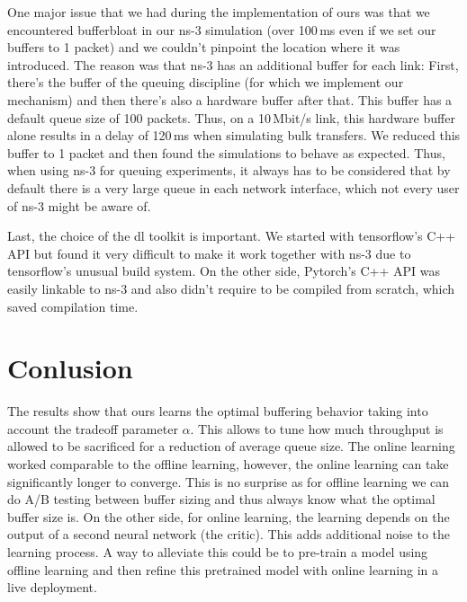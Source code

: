 \documentclass[conference]{IEEEtran}
\begin{document}
One major issue that we had during the implementation of \gls{ours} was that we encountered bufferbloat in our ns-3 simulation (over 100\,ms even if we set our buffers to 1 packet) and we couldn't pinpoint the location where it was introduced. The reason was that ns-3 has an additional buffer for each link: First, there's the buffer of the queuing discipline (for which we implement our mechanism) and then there's also a hardware buffer after that. This buffer has a default queue size of 100 packets. Thus, on a 10\,Mbit/s link, this hardware buffer alone results in a delay of 120\,ms when simulating bulk transfers. We reduced this buffer to 1 packet and then found the simulations to behave as expected. Thus, when using ns-3 for queuing experiments, it always has to be considered that by default there is a very large queue in each network interface, which not every user of ns-3 might be aware of. 

Last, the choice of the \gls{dl} toolkit is important. We started with tensorflow's C++ API but found it very difficult to make it work together with ns-3 due to tensorflow's unusual build system. On the other side, Pytorch's C++ API was easily linkable to ns-3 and also didn't require to be compiled from scratch, which saved compilation time. 

\section{Conlusion}

The results show that \gls{ours} learns the optimal buffering behavior taking into account the tradeoff parameter $\alpha$. This allows to tune how much throughput is allowed to be sacrificed for a reduction of average queue size. The online learning worked comparable to the offline learning, however, the online learning can take significantly longer to converge. This is no surprise as for offline learning we can do A/B testing between buffer sizing and thus always know what the optimal buffer size is. On the other side, for online learning, the learning depends on the output of a second neural network (the critic). This adds additional noise to the learning process. A way to alleviate this could be to pre-train a model using offline learning and then refine this pretrained model with online learning in a live deployment. 
\end{document}
